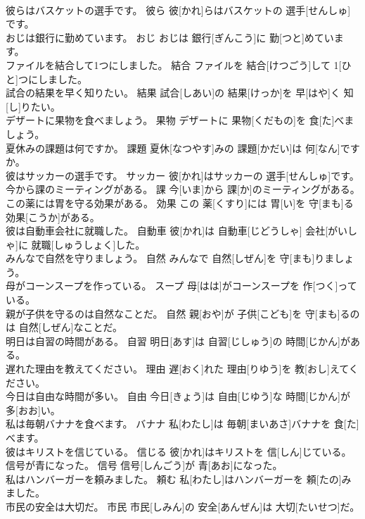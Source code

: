 \documentclass[8pt]{extreport}
\begin{document}
\begin{CJK}{UTF8}{min}
\\	彼らはバスケットの選手です。	彼ら	彼[かれ]らはバスケットの 選手[せんしゅ]です。	
\\	おじは銀行に勤めています。	おじ	おじは 銀行[ぎんこう]に 勤[つと]めています。	
\\	ファイルを結合して1つにしました。	結合	ファイルを 結合[けつごう]して 1[ひと]つにしました。	
\\	試合の結果を早く知りたい。	結果	試合[しあい]の 結果[けっか]を 早[はや]く 知[し]りたい。	
\\	デザートに果物を食べましょう。	果物	デザートに 果物[くだもの]を 食[た]べましょう。	
\\	夏休みの課題は何ですか。	課題	夏休[なつやす]みの 課題[かだい]は 何[なん]ですか。	
\\	彼はサッカーの選手です。	サッカー	彼[かれ]はサッカーの 選手[せんしゅ]です。	
\\	今から課のミーティングがある。	課	今[いま]から 課[か]のミーティングがある。	
\\	この薬には胃を守る効果がある。	効果	この 薬[くすり]には 胃[い]を 守[まも]る 効果[こうか]がある。	
\\	彼は自動車会社に就職した。	自動車	彼[かれ]は 自動車[じどうしゃ] 会社[がいしゃ]に 就職[しゅうしょく]した。	
\\	みんなで自然を守りましょう。	自然	みんなで 自然[しぜん]を 守[まも]りましょう。	
\\	母がコーンスープを作っている。	スープ	母[はは]がコーンスープを 作[つく]っている。	
\\	親が子供を守るのは自然なことだ。	自然	親[おや]が 子供[こども]を 守[まも]るのは 自然[しぜん]なことだ。	
\\	明日は自習の時間がある。	自習	明日[あす]は 自習[じしゅう]の 時間[じかん]がある。	
\\	遅れた理由を教えてください。	理由	遅[おく]れた 理由[りゆう]を 教[おし]えてください。	
\\	今日は自由な時間が多い。	自由	今日[きょう]は 自由[じゆう]な 時間[じかん]が 多[おお]い。	
\\	私は毎朝バナナを食べます。	バナナ	私[わたし]は 毎朝[まいあさ]バナナを 食[た]べます。	
\\	彼はキリストを信じている。	信じる	彼[かれ]はキリストを 信[しん]じている。	
\\	信号が青になった。	信号	信号[しんごう]が 青[あお]になった。	
\\	私はハンバーガーを頼みました。	頼む	私[わたし]はハンバーガーを 頼[たの]みました。	
\\	市民の安全は大切だ。	市民	市民[しみん]の 安全[あんぜん]は 大切[たいせつ]だ。	

\end{CJK}
\end{document}

